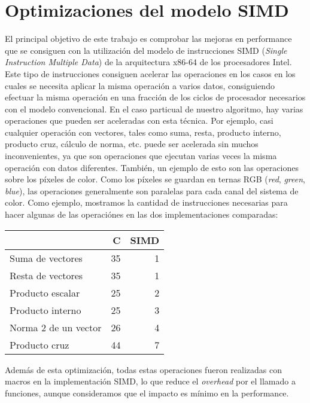 \section{Optimizaciones del modelo SIMD}

El principal objetivo de este trabajo es comprobar las mejoras en performance que se consiguen con la utilización del modelo de instrucciones SIMD (\emph{Single Instruction Multiple Data}) de la arquitectura x86-64 de los procesadores Intel. Este tipo de instrucciones consiguen acelerar las operaciones en los casos en los cuales se necesita aplicar la misma operación a varios datos, consiguiendo efectuar la misma operación en una fracción de los ciclos de procesador necesarios con el modelo convencional. En el caso particual de nuestro algoritmo, hay varias operaciones que pueden ser aceleradas con esta técnica. Por ejemplo, casi cualquier operación con vectores, tales como suma, resta, producto interno, producto cruz, cálculo de norma, etc. puede ser acelerada sin muchos inconvenientes, ya que son operaciones que ejecutan varias veces la misma operación con datos diferentes. También, un ejemplo de esto son las operaciones sobre los píxeles de color. Como los píxeles se guardan en ternas RGB (\emph{red}, \emph{green}, \emph{blue}), las operaciones generalmente son paralelas para cada canal del sistema de color. Como ejemplo, mostramos la cantidad de instrucciones necesarias para hacer algunas de las operaciónes en las dos implementaciones comparadas:\\

\begin{center}
\begin{tabular}[H]{l|r|r}
& \textbf{C} & \textbf{SIMD}\\\hline
Suma de vectores & 35 & 1 \\
Resta de vectores & 35 & 1\\
Producto escalar & 25 & 2\\
Producto interno & 25 & 3\\
Norma 2 de un vector & 26 & 4\\
Producto cruz & 44 & 7\\
\end{tabular}
\end{center}

\vspace{0.5cm}

Además de esta optimización, todas estas operaciones fueron realizadas con macros en la implementación SIMD, lo que reduce el \emph{overhead} por el llamado a funciones, aunque consideramos que el impacto es mínimo en la performance.